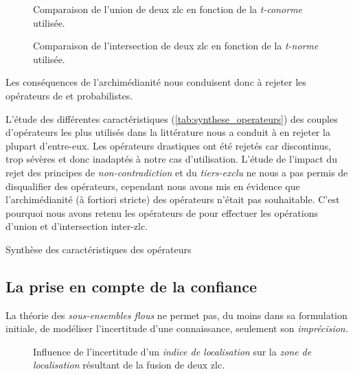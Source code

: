 \begin{figure}
  \centering
  
  \caption{Comparaison de l'union de deux \ac{zlc} en fonction de la
    \emph{t-conorme} utilisée.}
  \label{fig:comparaison_operateurs_union}
\end{figure}

\begin{figure}
  \centering
  
  \caption{Comparaison de l'intersection de deux \ac{zlc} en fonction
    de la \emph{t-norme} utilisée.}
  \label{fig:comparaison_operateurs_intersection}
\end{figure}

Les conséquences de l'archimédianité nous conduisent donc à rejeter
les opérateurs de  et probabilistes. 


L'étude des différentes caractéristiques
(\autoref{tab:synthese_operateurs}) des couples d'opérateurs les plus
utilisés dans la littérature nous a conduit à en rejeter la plupart
d'entre-eux. Les opérateurs drastiques ont été rejetés car
discontinus, trop sévères et donc inadaptés à notre cas
d'utilisation. L'étude de l'impact du rejet des principes de
\emph{non-contradiction} et du \emph{tiers-exclu} ne nous a pas permis
de disqualifier des opérateurs, cependant nous avons mis en évidence
que l'archimédianité (à fortiori stricte) des opérateurs n'était pas
souhaitable. C'est pourquoi nous avons retenu les opérateurs de
\textcite{Zadeh1965} pour effectuer les opérations d'union et
d'intersection inter-\ac{zlc}.

\begin{table}
  \centering
  
  \caption{Synthèse des caractéristiques des opérateurs}
  \label{tab:synthese_operateurs}
\end{table}

\subsection{La prise en compte de la confiance}


La théorie des \emph{sous-ensembles flous} ne permet pas, du moins
dans sa formulation initiale, de modéliser l'incertitude d'une
connaissance, seulement son \emph{imprécision.}

\textcite{Zadeh1978}

\begin{figure}
  \centering
  \caption{Influence de l'incertitude d'un \emph{indice de
      localisation} sur la \emph{zone de localisation} résultant de la
    fusion de deux \ac{zlc}.}
  \label{fig:intersection}
\end{figure}


